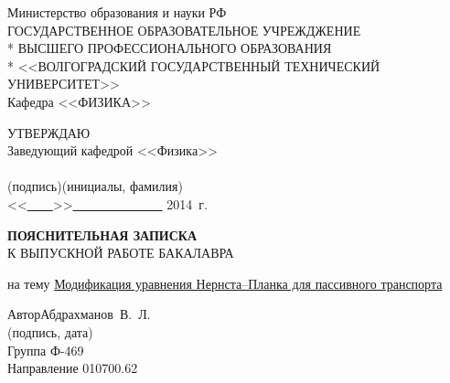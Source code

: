\begin{titlepage}
\begin{center}
Министерство образования и науки РФ \\
\vspace{.5cm}
ГОСУДАРСТВЕННОЕ ОБРАЗОВАТЕЛЬНОЕ УЧРЕЖДЖЕНИЕ\\*
ВЫСШЕГО ПРОФЕССИОНАЛЬНОГО ОБРАЗОВАНИЯ\\*
<<ВОЛГОГРАДСКИЙ ГОСУДАРСТВЕННЫЙ ТЕХНИЧЕСКИЙ УНИВЕРСИТЕТ>>\\
\vspace{.5cm}
Кафедра <<ФИЗИКА>>
\vspace{.5cm}
\end{center}
\begin{flushright}
УТВЕРЖДАЮ\\
Заведующий кафедрой <<Физика>>\\
\vspace{.3cm}
\underline{\hspace{2cm}}\hspace{1cm}\underline{\hspace{4cm}}\\
\vspace{-.2cm}\footnotesize(подпись)\hspace{1.8cm}(инициалы, фамилия)\hspace*{.2cm}\ \normalsize\\
\vspace{.3cm}
<<\underline{\ \ \ \ }>>\underline{\ \ \ \ \ \ \ \ \ \ \ \ \ \ } 2014~г.
\end{flushright}
\begin{center}
\LARGE \textbf{ПОЯСНИТЕЛЬНАЯ ЗАПИСКА} \\
\large К ВЫПУСКНОЙ РАБОТЕ БАКАЛАВРА
\end{center}
\begin{center}
на тему
\underline{Модификация уравнения Нернста--Планка для пассивного транспорта}
\end{center}
\begin{flushleft}
Автор\hspace{.7cm}Абдрахманов~В.~Л.\hfill\underline{\hspace{5cm}}\\
\vspace{-.2cm}\hspace{14cm}\footnotesize(подпись, дата)\normalsize\\
\vspace{-.5cm}
Группа Ф-469\\
Направление 010700.62\\

\end{flushleft}
\end{titlepage}
